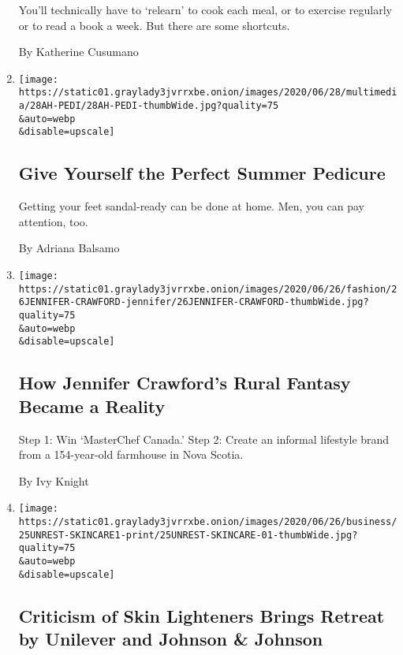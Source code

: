 \begin{enumerate}
  You'll technically have to `relearn' to cook each meal, or to exercise
  regularly or to read a book a week. But there are some shortcuts.

  By Katherine Cusumano
\item
  \href{/2020/06/27/at-home/coronavirus-DIY-pedicure.html}{}

  \texttt{[image: https://static01.graylady3jvrrxbe.onion/images/2020/06/28/multimedia/28AH-PEDI/28AH-PEDI-thumbWide.jpg?quality=75\\\&auto=webp\\\&disable=upscale]}

  \hypertarget{give-yourself-the-perfect-summer-pedicure}{%
  \subsection{Give Yourself the Perfect Summer
  Pedicure}\label{give-yourself-the-perfect-summer-pedicure}}

  Getting your feet sandal-ready can be done at home. Men, you can pay
  attention, too.

  By Adriana Balsamo
\item
  \href{/2020/06/26/style/self-care/how-jennifer-crawfords-rural-fantasy-became-a-reality.html}{}

  \texttt{[image: https://static01.graylady3jvrrxbe.onion/images/2020/06/26/fashion/26JENNIFER-CRAWFORD-jennifer/26JENNIFER-CRAWFORD-thumbWide.jpg?quality=75\\\&auto=webp\\\&disable=upscale]}

  \hypertarget{how-jennifer-crawfords-rural-fantasy-became-a-reality}{%
  \subsection{How Jennifer Crawford's Rural Fantasy Became a
  Reality}\label{how-jennifer-crawfords-rural-fantasy-became-a-reality}}

  Step 1: Win `MasterChef Canada.' Step 2: Create an informal lifestyle
  brand from a 154-year-old farmhouse in Nova Scotia.

  By Ivy Knight
\item
  \href{/2020/06/25/business/unilever-jj-skin-care-lightening.html}{}

  \texttt{[image: https://static01.graylady3jvrrxbe.onion/images/2020/06/26/business/25UNREST-SKINCARE1-print/25UNREST-SKINCARE-01-thumbWide.jpg?quality=75\\\&auto=webp\\\&disable=upscale]}

  \hypertarget{criticism-of-skin-lighteners-brings-retreat-by-unilever-and-johnson--johnson}{%
  \subsection{Criticism of Skin Lighteners Brings Retreat by Unilever
  and Johnson \&
  Johnson}\label{criticism-of-skin-lighteners-brings-retreat-by-unilever-and-johnson--johnson}}


\end{enumerate}
